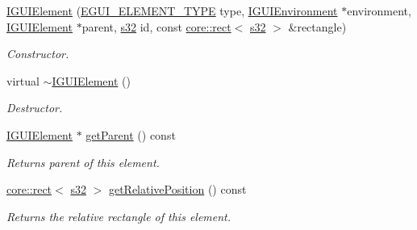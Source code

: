 \begin{DoxyCompactItemize}
\hyperlink{classirr_1_1gui_1_1IGUIElement_a540fb9b2617696ef421d5510b4d96fea}{I\+G\+U\+I\+Element} (\hyperlink{namespaceirr_1_1gui_ae4d66df0ecf4117cdbcf9f22404bd254}{E\+G\+U\+I\+\_\+\+E\+L\+E\+M\+E\+N\+T\+\_\+\+T\+Y\+PE} type, \hyperlink{classirr_1_1gui_1_1IGUIEnvironment}{I\+G\+U\+I\+Environment} $\ast$environment, \hyperlink{classirr_1_1gui_1_1IGUIElement}{I\+G\+U\+I\+Element} $\ast$parent, \hyperlink{namespaceirr_ac66849b7a6ed16e30ebede579f9b47c6}{s32} id, const \hyperlink{classirr_1_1core_1_1rect}{core\+::rect}$<$ \hyperlink{namespaceirr_ac66849b7a6ed16e30ebede579f9b47c6}{s32} $>$ \&rectangle)
\begin{DoxyCompactList}\small\item\em Constructor. \end{DoxyCompactList}\item 
\mbox{\label{classirr_1_1gui_1_1IGUIElement_a062e6704aa29ed50c22179ad268d8f48}} 
virtual \hyperlink{classirr_1_1gui_1_1IGUIElement_a062e6704aa29ed50c22179ad268d8f48}{$\sim$\+I\+G\+U\+I\+Element} ()
\begin{DoxyCompactList}\small\item\em Destructor. \end{DoxyCompactList}\item 
\mbox{\label{classirr_1_1gui_1_1IGUIElement_ab3eacf3540cb5b020f3c4a24c6a67473}} 
\hyperlink{classirr_1_1gui_1_1IGUIElement}{I\+G\+U\+I\+Element} $\ast$ \hyperlink{classirr_1_1gui_1_1IGUIElement_ab3eacf3540cb5b020f3c4a24c6a67473}{get\+Parent} () const
\begin{DoxyCompactList}\small\item\em Returns parent of this element. \end{DoxyCompactList}\item 
\mbox{\label{classirr_1_1gui_1_1IGUIElement_a056c893bcfe330c9c6058b6027a45cef}} 
\hyperlink{classirr_1_1core_1_1rect}{core\+::rect}$<$ \hyperlink{namespaceirr_ac66849b7a6ed16e30ebede579f9b47c6}{s32} $>$ \hyperlink{classirr_1_1gui_1_1IGUIElement_a056c893bcfe330c9c6058b6027a45cef}{get\+Relative\+Position} () const
\begin{DoxyCompactList}\small\item\em Returns the relative rectangle of this element. \end{DoxyCompactList}\item 

\end{DoxyCompactItemize}
